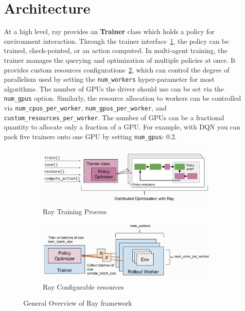 \section{Architecture}

At a high level, ray provides an \textbf{\colorbox{gray!20}{Trainer}} class which holds a policy for environment interaction. Through the trainer interface~\ref{fig:ray_trainer}, the policy can be trained, check-pointed, or an action computed. In multi-agent training, the trainer manages the querying and optimization of multiple policies at once. It provides custom resources configurations~\ref{fig:ray_config}, which can control the degree of parallelism used by setting the \colorbox{gray!20}{\texttt{num\_workers}} hyper-parameter for most algorithms. The number of GPUs the driver should use can be set via the \colorbox{gray!20}{\texttt{num\_gpus}} option. Similarly, the resource allocation to workers can be controlled via \colorbox{gray!20}{\texttt{num\_cpus\_per\_worker}}, \colorbox{gray!20}{\texttt{num\_gpus\_per\_worker}}, and \colorbox{gray!20}{\texttt{custom\_resources\_per\_worker}}. The number of GPUs can be a fractional quantity to allocate only a fraction of a GPU. For example, with DQN you can pack five trainers onto one GPU by setting \colorbox{gray!20}{\texttt{num\_gpus}: 0.2}.

\begin{figure}[!htb]
	\centering
	\begin{subfigure}[b]{0.4\textwidth}
		\centering
		\includegraphics[width=\textwidth]{figures/architecture/ray_trainer.png}
		\caption{Ray Training Process}
		\label{fig:ray_trainer}
    \end{subfigure}
    \hfill
	\begin{subfigure}[b]{0.4\textwidth}
		\centering
		\includegraphics[width=\textwidth]{figures/architecture/ray_config.png}
        \caption{Ray Configurable resources}
		\label{fig:ray_config}
	\end{subfigure}
	\hfill
	   \caption{General Overview of Ray framework~\parencite{moritz2018ray}}
	   \label{fig:ray}
\end{figure}

